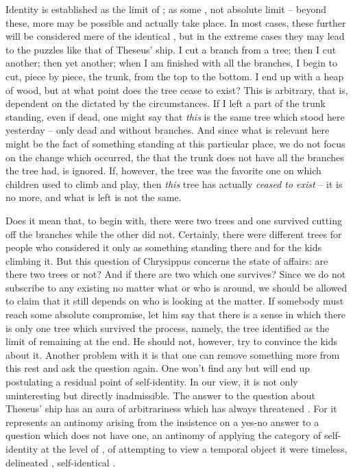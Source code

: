 Identity is established as the limit of ; as some
, not absolute limit -- beyond these, more  may be
possible and actually take place.  In most cases, these further
 will be considered mere  of the identical
, but in the extreme cases they may lead to the puzzles like that
of Theseus' ship.  I cut a branch from a tree; then I cut another; then yet
another; when I am finished with all the branches, I begin to cut, piece by
piece, the trunk, from the top to the bottom.  I end up with a heap of wood, but
at what point does the tree cease to exist?  This is arbitrary, that is,
dependent on the  dictated by the circumstances.  If I left a
part of the trunk standing, even if dead, one might say that {\em this} is the
same tree which stood here yesterday -- only dead and without branches.  And
since what is relevant here might be the fact of something standing at this
particular place, we do not focus on the change which occurred, the
 that the trunk does not have all the branches the tree had, is
ignored.  If, however, the tree was the favorite one on which children used to
climb and play, then {\em this} tree has actually {\em ceased to exist} -- it is
no more, and what is left is not the same.

Does it mean that, to begin with, there were two trees and one survived cutting
off the branches while the other did not. Certainly, there were different trees
for people who considered it only as something standing there and for the kids
climbing it. But this question of Chrysippus concerns the  state
of affairs: are there two trees or not? And if there are two which one survives?
Since we do not subscribe to any  existing  no matter what or who is around, we should be allowed to claim that it
still depends on who is looking at the matter.  If somebody must reach some
absolute compromise, let him say that there is a sense in which there is only
one tree which survived the process, namely, the tree identified as the limit of
 remaining at the end. He should not, however, try to convince
the kids about it. Another problem with it is that one can remove something more
from this rest and ask the question again.  One won't find any  but
will end up postulating a residual point of self-identity. In our view, it is
not only uninteresting but directly inadmissible.  The answer to the question
about Theseus' ship has an aura of arbitrariness which has always threatened
. For it represents an antinomy arising from the insistence
on a yes-no answer to a question which does not have one, an antinomy of
applying the  category of self-identity at the level of
, of attempting to view a temporal object  it were
timeless,  delineated , self-identical
.


